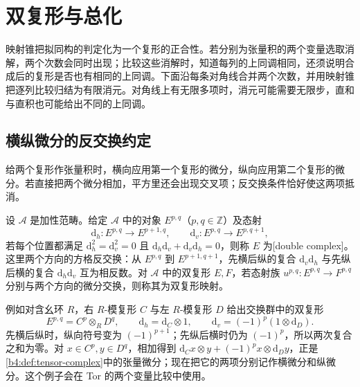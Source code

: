 
\section{双复形与总化}
\label{b4:sec:0604}

映射锥把拟同构的判定化为一个复形的正合性。若分别为张量积的两个变量选取消解，两个次数会同时出现；比较这些消解时，知道每列的上同调相同，还须说明合成后的复形是否也有相同的上同调。下面沿每条对角线合并两个次数，并用映射锥把逐列比较归结为有限消元。对角线上有无限多项时，消元可能需要无限步，直和与直积也可能给出不同的上同调。

%
%
%

\subsection{横纵微分的反交换约定}
\label{b4:subsec:0604:01}

给两个复形作张量积时，横向应用第一个复形的微分，纵向应用第二个复形的微分。若直接把两个微分相加，平方里还会出现交叉项；反交换条件恰好使这两项抵消。

\begin{definition}\label{b4:def:double-complex}
	设 \(\mathcal A\) 是加性范畴。给定 \(\mathcal A\) 中的对象 \(E^{p,q}\)（\(p,q\in\mathbb Z\)）及态射
	\[
		\mathrm{d}_h:E^{p,q}\to E^{p+1,q},\qquad \mathrm{d}_v:E^{p,q}\to E^{p,q+1},
	\]
	若每个位置都满足 \(\mathrm{d}_h^2=\mathrm{d}_v^2=0\) 且 \(\mathrm{d}_h\mathrm{d}_v+\mathrm{d}_v\mathrm{d}_h=0\)，则称 \(E\) 为[double complex]。这里两个方向的方格反交换：从 \(E^{p,q}\) 到 \(E^{p+1,q+1}\)，先横后纵的复合 \(\mathrm{d}_v\mathrm{d}_h\) 与先纵后横的复合 \(\mathrm{d}_h\mathrm{d}_v\) 互为相反数。对 \(\mathcal A\) 中的双复形 \(E,F\)，若态射族 \(u^{p,q}:E^{p,q}\to F^{p,q}\) 分别与两个方向的微分交换，则称其为双复形映射。
\end{definition}

例如对含幺环 \(R\)，右 \(R\)-模复形 \(C\) 与左 \(R\)-模复形 \(D\) 给出交换群中的双复形
\[
	E^{p,q}=C^p\otimes_R D^q,\qquad \mathrm{d}_h=\mathrm{d}_C\otimes1,\qquad \mathrm{d}_v=(-1)^p(1\otimes \mathrm{d}_D).
\]
先横后纵时，纵向符号变为 \((-1)^{p+1}\)；先纵后横时仍为 \((-1)^p\)，所以两次复合之和为零。对 \(x\in C^p,y\in D^q\)，相加得到 \(\mathrm{d}_Cx\otimes y+(-1)^p x\otimes\mathrm{d}_Dy\)，正是\cref{b4:def:tensor-complex}中的张量微分；现在把它的两项分别记作横微分和纵微分。这个例子会在 Tor 的两个变量比较中使用。

